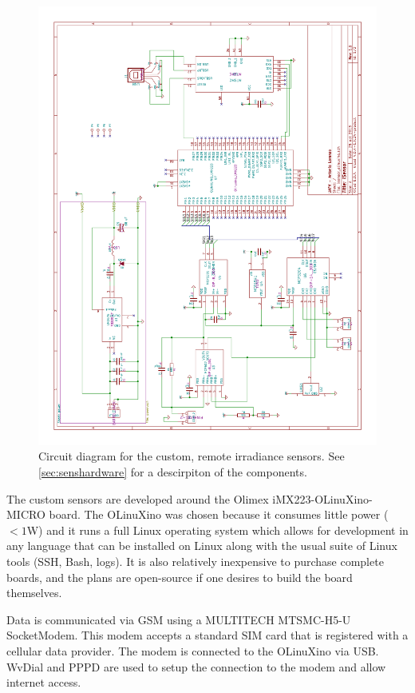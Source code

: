 \begin{figure}
\includegraphics[angle=-90,width=\textwidth]{figs/circuit.pdf}
\caption[Custom sensor circuit diagram]{Circuit diagram for the
  custom, remote irradiance sensors. See \cref{sec:senshardware} for a
  descirpiton of the components.}
\label{fig:circuit}
\end{figure}

The custom sensors are developed around the Olimex
iMX223-OLinuXino-MICRO board.
The OLinuXino was chosen because it consumes little power ($< 1$W) and it
runs a full Linux operating system which allows for development in any
language that can be installed on Linux along with the usual suite of
Linux tools (SSH, Bash, logs).
It is also relatively inexpensive to purchase complete boards, and the
plans are open-source if one desires to build the board themselves.

Data is communicated via GSM using a MULTITECH MTSMC-H5-U SocketModem.
This modem accepts a standard SIM card that is registered with a
cellular data provider.
The modem is connected to the OLinuXino via USB.
WvDial and PPPD are used to setup the connection to the modem and
allow internet access.

